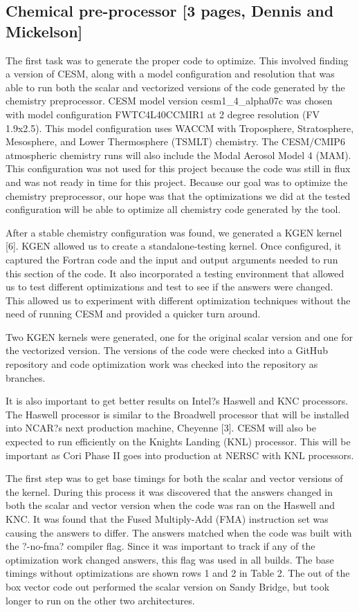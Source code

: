 \subsection{Chemical pre-processor [{\color{red}3 pages, Dennis and Mickelson}]}\label{sec:chempreproc}

The first task was to generate the proper code to optimize.  This involved finding a version of CESM, along with a model configuration and resolution that was able to run both the scalar and vectorized versions of the code generated by the chemistry preprocessor.  CESM model version cesm1\_4\_alpha07c was chosen with model configuration FWTC4L40CCMIR1 at 2 degree resolution (FV 1.9x2.5).  This model configuration uses WACCM with Troposphere, Stratosphere, Mesosphere, and Lower Thermosphere (TSMLT) chemistry.  The CESM/CMIP6 atmospheric chemistry runs will also include the Modal Aerosol Model 4 (MAM).  This configuration was not used for this project because the code was still in flux and was not ready in time for this project.  Because our goal was to optimize the chemistry preprocessor, our hope was that the optimizations we did at the tested configuration will be able to optimize all chemistry code generated by the tool.

After a stable chemistry configuration was found, we generated a KGEN kernel [6].  KGEN allowed us to create a standalone-testing kernel.  Once configured, it captured the Fortran code and the input and output arguments needed to run this section of the code.  It also incorporated a testing environment that allowed us to test different optimizations and test to see if the answers were changed.  This allowed us to experiment with different optimization techniques without the need of running CESM and provided a quicker turn around.

Two KGEN kernels were generated, one for the original scalar version and one for the vectorized version.  The versions of the code were checked into a GitHub repository and code optimization work was checked into the repository as branches.

It is also important to get better results on Intel?s Haswell and KNC processors.  The Haswell processor is similar to the Broadwell processor that will be installed into NCAR?s next production machine, Cheyenne [3].  CESM will also be expected to run efficiently on the Knights Landing (KNL) processor.  This will be important as Cori Phase II goes into production at NERSC with KNL processors.  

The first step was to get base timings for both the scalar and vector versions of the kernel.  During this process it was discovered that the answers changed in both the scalar and vector version when the code was ran on the Haswell and KNC.  It was found that the Fused Multiply-Add (FMA) instruction set was causing the answers to differ.  The answers matched when the code was built with the ?-no-fma? compiler flag.  Since it was important to track if any of the optimization work changed answers, this flag was used in all builds.  The base timings without optimizations are shown rows 1 and 2 in Table 2.  The out of the box vector code out performed the scalar version on Sandy Bridge, but took longer to run on the other two architectures.

